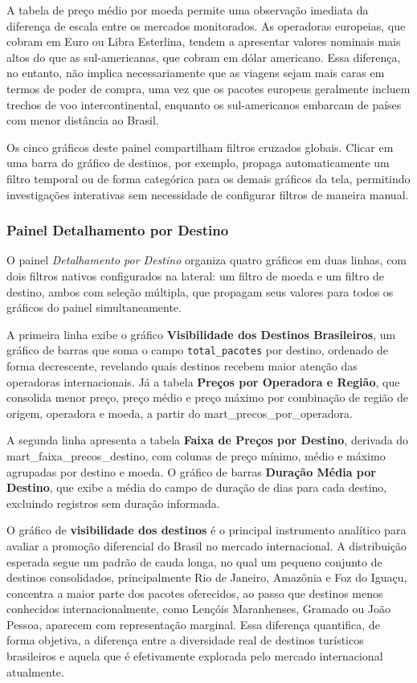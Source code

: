 A tabela de preço médio por moeda permite uma observação imediata da
diferença de escala entre os mercados monitorados. As operadoras europeias, que
cobram em Euro ou Libra Esterlina, tendem a apresentar valores nominais mais altos
do que as sul-americanas, que cobram em dólar americano. Essa diferença, no entanto,
não implica necessariamente que as viagens sejam mais caras em termos de poder de
compra, uma vez que os pacotes europeus geralmente incluem trechos de voo
intercontinental, enquanto os sul-americanos embarcam de países com menor distância ao
Brasil.

Os cinco gráficos deste painel compartilham filtros cruzados globais. Clicar em uma barra do gráfico de destinos, por exemplo, propaga
automaticamente um filtro temporal ou de forma categórica para os demais gráficos da tela,
permitindo investigações interativas sem necessidade de configurar filtros de maneira manual.

\subsubsection{Painel Detalhamento por Destino}

O painel \textit{Detalhamento por Destino} organiza quatro gráficos em duas linhas,
com dois filtros nativos configurados na lateral: um filtro de moeda e um filtro de
destino, ambos com seleção múltipla, que propagam seus valores para todos os gráficos
do painel simultaneamente.

A primeira linha exibe o gráfico \textbf{Visibilidade dos Destinos Brasileiros},
um gráfico de barras que soma o campo \texttt{total\_pacotes} por destino, ordenado
de forma decrescente, revelando quais destinos recebem maior atenção das operadoras
internacionais. Já a tabela \textbf{Preços por Operadora e Região}, que consolida
menor preço, preço médio e preço máximo por combinação de região de origem, operadora
e moeda, a partir do 
mart\_precos\_por\_operadora.

A segunda linha apresenta a tabela \textbf{Faixa de Preços por Destino}, derivada
do mart\_faixa\_precos\_destino, com colunas de preço mínimo, médio e máximo
agrupadas por destino e moeda. O gráfico de barras \textbf{Duração Média por
Destino}, que exibe a média do campo de duração de dias para cada destino,
excluindo registros sem duração informada.

O gráfico de \textbf{visibilidade dos destinos} é o principal instrumento analítico
para avaliar a promoção diferencial do Brasil no mercado internacional. A distribuição
esperada segue um padrão de cauda longa, no qual um pequeno conjunto de destinos
consolidados, principalmente Rio de Janeiro, Amazônia e Foz do Iguaçu, concentra a
maior parte dos pacotes oferecidos, ao passo que destinos menos conhecidos
internacionalmente, como Lençóis Maranhenses, Gramado ou João Pessoa, aparecem com
representação marginal. Essa diferença quantifica, de forma objetiva, a diferença
entre a diversidade real de destinos turísticos brasileiros e aquela que é efetivamente
explorada pelo mercado internacional atualmente.

